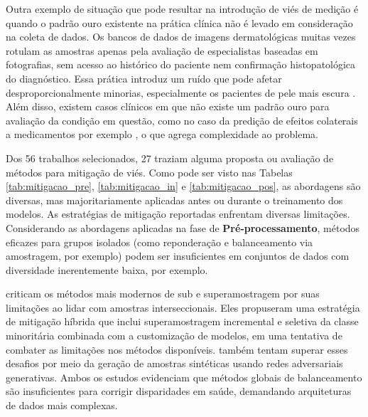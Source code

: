 Outra exemplo de situação que pode resultar na introdução de viés de medição é quando o padrão ouro existente na prática clínica não é levado em consideração na coleta de dados. Os bancos de dados de imagens dermatológicas muitas vezes rotulam as amostras apenas pela avaliação de especialistas baseadas em fotografias, sem acesso ao histórico do paciente nem confirmação histopatológica do diagnóstico. Essa prática introduz um ruído que pode afetar desproporcionalmente minorias, especialmente os pacientes de pele mais escura \cite{daneshjou2022disparities}. Além disso, existem casos clínicos em que não existe um padrão ouro para avaliação da condição em questão, como no caso da predição de efeitos colaterais a medicamentos por exemplo \cite{chandak2020using}, o que agrega complexidade ao problema.

Dos 56 trabalhos selecionados, 27 traziam alguma proposta ou avaliação de métodos para mitigação de viés. Como pode ser visto nas Tabelas \ref{tab:mitigacao_pre}, \ref{tab:mitigacao_in} e \ref{tab:mitigacao_pos}, as abordagens são diversas, mas majoritariamente aplicadas antes ou durante o treinamento dos modelos. As estratégias de mitigação reportadas enfrentam diversas limitações. Considerando as abordagens aplicadas na fase de \textbf{Pré-processamento}, métodos eficazes para grupos isolados (como reponderação e balanceamento via amostragem, por exemplo) podem ser insuficientes em conjuntos de dados com diversidade inerentemente baixa, por exemplo.

\citet{afrose2022subpopulation} criticam os métodos mais modernos de sub e superamostragem por suas limitações ao lidar com amostras interseccionais. Eles propuseram uma estratégia de mitigação híbrida que inclui superamostragem incremental e seletiva da classe minoritária combinada com a customização de modelos, em uma tentativa de combater as limitações nos métodos disponíveis. \citet{burlina2021addressing} também tentam superar esses desafios por meio da geração de amostras sintéticas usando redes adversariais generativas. Ambos os estudos evidenciam que métodos globais de balanceamento são insuficientes para corrigir disparidades em saúde, demandando arquiteturas de dados mais complexas.


